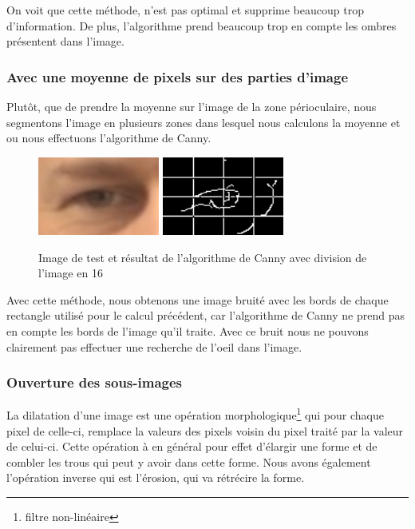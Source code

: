 On voit que cette méthode, n'est pas optimal et supprime beaucoup trop d'information. De plus,
l'algorithme prend beaucoup trop en compte les ombres présentent dans l'image.

\subsubsection{Avec une moyenne de pixels sur des parties d'image}

Plutôt, que de prendre la moyenne sur l'image de la zone périoculaire, nous segmentons l'image
en plusieurs zones dans lesquel nous calculons la moyenne et ou nous effectuons l'algorithme
de Canny.

\begin{figure}[H]
 \center
 \includegraphics[width=4cm]{image/original.png}
 \includegraphics[width=4cm]{image/canny_decomposition.png}
 \caption{Image de test et résultat de l'algorithme de Canny avec division de l'image en 16}
\end{figure}

Avec cette méthode, nous obtenons une image bruité avec les bords de chaque rectangle utilisé
pour le calcul précédent, car l'algorithme de Canny ne prend pas en compte les bords de l'image
qu'il traite. Avec ce bruit nous ne pouvons clairement pas effectuer une recherche de l'oeil dans
l'image.

\subsubsection{Ouverture des sous-images}

La dilatation d'une image est une opération morphologique\footnote{filtre non-linéaire} qui pour chaque
pixel de celle-ci, remplace la valeurs des pixels voisin du pixel traité par la valeur de celui-ci.
Cette opération à en général pour effet d'élargir une forme et de combler les trous qui peut y avoir
dans cette forme. Nous avons également l'opération inverse qui est l'érosion, qui va rétrécire la forme.\\


